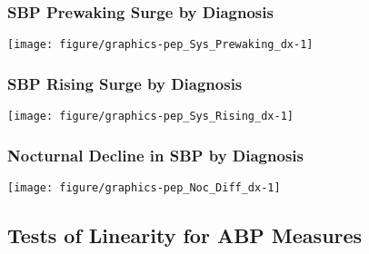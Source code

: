 \documentclass[10pt]{article}\usepackage[]{graphicx}\usepackage[]{color}
\makeatletter
\def\maxwidth{ %
  \ifdim\Gin@nat@width>\linewidth
    \linewidth
  \else
    \Gin@nat@width
  \fi
}
\newenvironment{knitrout}{}{} %
\makeatother
\begin{document}
\begin{landscape}
\subsubsection{SBP Prewaking Surge by Diagnosis}
\begin{knitrout}
\color{fgcolor}

{\centering \texttt{[image: figure/graphics-pep\_Sys\_Prewaking\_dx-1]} 

}



\end{knitrout}
\end{landscape}
\begin{landscape}
\subsubsection{SBP Rising Surge by Diagnosis}
\begin{knitrout}
\color{fgcolor}

{\centering \texttt{[image: figure/graphics-pep\_Sys\_Rising\_dx-1]} 

}



\end{knitrout}
\end{landscape}
\begin{landscape}
\subsubsection{Nocturnal Decline in SBP by Diagnosis}
\begin{knitrout}
\color{fgcolor}

{\centering \texttt{[image: figure/graphics-pep\_Noc\_Diff\_dx-1]} 

}



\end{knitrout}
\end{landscape}

\subsection{Tests of Linearity for ABP Measures}
\end{document}
